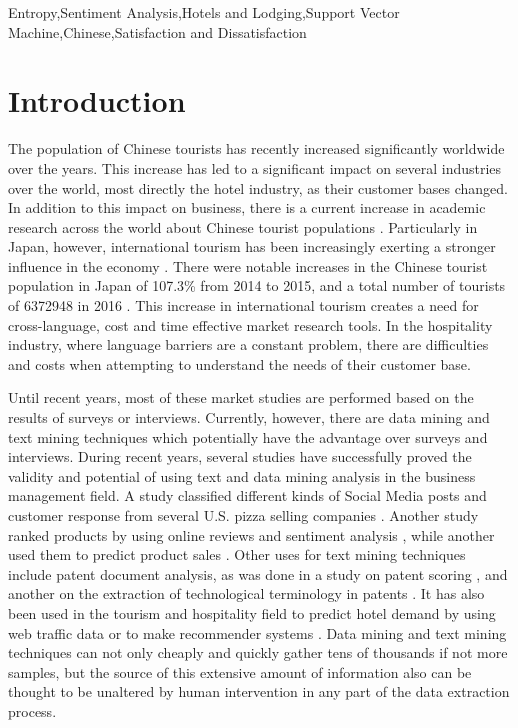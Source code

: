 \documentclass[review]{elsarticle}
\begin{document}
\begin{frontmatter}
\begin{abstract}
\end{abstract}

\begin{keyword}
Entropy\sep Sentiment Analysis\sep Hotels and Lodging\sep Support Vector Machine\sep Chinese\sep Satisfaction and Dissatisfaction
\end{keyword}

\end{frontmatter}

\section{Introduction}\label{intro}

The population of Chinese tourists has recently increased significantly worldwide over the years. This increase has led to a significant impact on several industries over the world, most directly the hotel industry, as their customer bases changed. In addition to this impact on business, there is a current increase in academic research across the world about Chinese tourist populations \cite[][]{sun2017}. Particularly in Japan, however, international tourism has been increasingly exerting a stronger influence in the economy \cite[][]{Jones2009}. There were notable increases in the Chinese tourist population in Japan of 107.3\% from 2014 to 2015, and a total number of tourists of \num[group-separator={,}]{6372948} in 2016 \cite[][]{jnto2017}. This increase in international tourism creates a need for cross-language, cost and time effective market research tools. In the hospitality industry, where language barriers are a constant problem, there are difficulties and costs when attempting to understand the needs of their customer base. 

Until recent years, most of these market studies are performed based on the results of surveys or interviews. Currently, however, there are data mining and text mining techniques which potentially have the advantage over surveys and interviews. During recent years, several studies have successfully proved the validity and potential of using text and data mining analysis in the business management field. A study classified different kinds of Social Media posts and customer response from several U.S. pizza selling companies \cite[][]{he2013}. Another study ranked products by using online reviews and sentiment analysis \cite[][]{liu2017149}, while another used them to predict product sales \cite[][]{fan201790}. Other uses for text mining techniques include patent document analysis, as was done in a study on patent scoring \cite[][]{nonaka2014}, and another on the extraction of technological terminology in patents \cite[][]{nonaka2012}. It has also been used in the tourism and hospitality field to predict hotel demand by using web traffic data \cite[][]{yang2014} or to make recommender systems \cite[][]{loh2003}. Data mining and text mining techniques can not only cheaply and quickly gather tens of thousands if not more samples, but the source of this extensive amount of information also can be thought to be unaltered by human intervention in any part of the data extraction process. 
\end{document}
